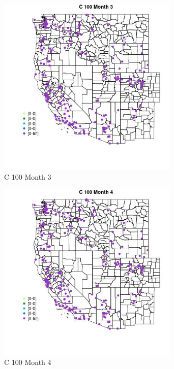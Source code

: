 \begin{figure} 
\centering  
\includegraphics[width=0.77\textwidth]{Code_Outputs/Report_ML_input_PM25_Step4_part_e_de_duplicated_aveswNAs_MapObsMo3C_100.jpg} 
\caption{\label{fig:Report_ML_input_PM25_Step4_part_e_de_duplicated_aveswNAsMapObsMo3C_100}C 100 Month 3} 
\end{figure} 
 

\begin{figure} 
\centering  
\includegraphics[width=0.77\textwidth]{Code_Outputs/Report_ML_input_PM25_Step4_part_e_de_duplicated_aveswNAs_MapObsMo4C_100.jpg} 
\caption{\label{fig:Report_ML_input_PM25_Step4_part_e_de_duplicated_aveswNAsMapObsMo4C_100}C 100 Month 4} 
\end{figure} 
 

